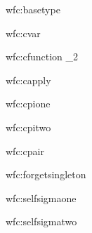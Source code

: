 \documentclass{article}
\theoremstyle{break}
\begin{document}
  {wfc:basetype}
  {\validcontext{\context}}
  {\validconstructor{\context}{\basetype}{\ktype}}

  {wfc:cvar}
  {\validcontext{\context}}
  {\validconstructor{\context}{\cvar}{\context(\cvar)}}

  {wfc:cfunction}
  {\qquad
          {\constructor}{\kind_2}}
  {\validconstructor{\context}
     {}
     {}}

  {wfc:capply}
  {
   \qquad
   }
  {
      {}}

  {wfc:cpione}
  {}
  {}

  {wfc:cpitwo}
  {}
  {
          {}}

  {wfc:cpair}
  {\qquad
   \qquad
    {}}
  {
      {}}

  {wfc:forgetsingleton}
  {\validconstructor{\context}{\constructor}{\ktype}}
  {\validconstructor{\context}{\constructor}{\ksingleton{\constructor}}}

  {wfc:selfsigmaone}
  {\validconstructor{\context}{\constructor}
                       {}\qquad
      }
  {\validconstructor{\context}{\constructor}
                       {}}

  {wfc:selfsigmatwo}
  {\validconstructor{\context}{\constructor}
                       {}\qquad
      }
  {\validconstructor{\context}{\constructor}
                       {}}
\end{document}
